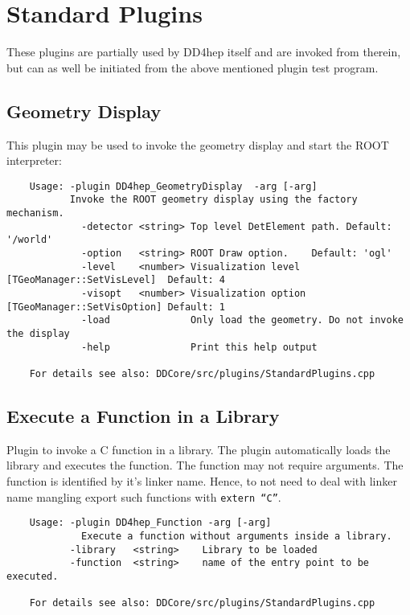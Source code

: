 \section{Standard Plugins}
\label{sec:dd4hep-manual-standard-plugins}
These plugins are partially used by DD4hep itself and are invoked from therein,
but can as well be initiated from the above mentioned plugin test program.

\subsection{Geometry Display}
\label{sec:dd4hep-manual-plugin-geometry-display}

This plugin may be used to invoke the geometry display and start the ROOT interpreter:
\begin{verbatim}
    Usage: -plugin DD4hep_GeometryDisplay  -arg [-arg]                                
  	       Invoke the ROOT geometry display using the factory mechanism.                
             -detector <string> Top level DetElement path. Default: '/world'                
             -option   <string> ROOT Draw option.    Default: 'ogl'                         
             -level    <number> Visualization level  [TGeoManager::SetVisLevel]  Default: 4 
             -visopt   <number> Visualization option [TGeoManager::SetVisOption] Default: 1       
             -load              Only load the geometry. Do not invoke the display          
             -help              Print this help output         

    For details see also: DDCore/src/plugins/StandardPlugins.cpp
\end{verbatim}

\subsection{Execute a Function in a Library}
\label{sec:dd4hep-manual-plugin-execute-function}

Plugin to invoke a C function in a library. The plugin automatically loads the library and
executes the function. The function may not require arguments. The function is identified by it's 
linker name. Hence, to not need to deal with linker name mangling export such functions
with \texttt{extern ``C''}.
\begin{verbatim}
    Usage: -plugin DD4hep_Function -arg [-arg]                                 
             Execute a function without arguments inside a library.     
           -library   <string>    Library to be loaded                    
           -function  <string>    name of the entry point to be executed. 

    For details see also: DDCore/src/plugins/StandardPlugins.cpp
\end{verbatim}

